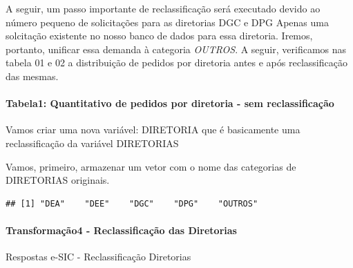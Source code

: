 \documentclass[]{article}
\newenvironment{Shaded}{\begin{snugshade}}{\end{snugshade}}
\newcommand{\CommentTok}[1]{\textcolor[rgb]{0.56,0.35,0.01}{\textit{#1}}}
\newcommand{\DataTypeTok}[1]{\textcolor[rgb]{0.13,0.29,0.53}{#1}}
\newcommand{\KeywordTok}[1]{\textcolor[rgb]{0.13,0.29,0.53}{\textbf{#1}}}
\newcommand{\NormalTok}[1]{#1}
\newcommand{\OperatorTok}[1]{\textcolor[rgb]{0.81,0.36,0.00}{\textbf{#1}}}
\newcommand{\StringTok}[1]{\textcolor[rgb]{0.31,0.60,0.02}{#1}}
\let\oldparagraph\paragraph
\renewcommand{\paragraph}[1]{\oldparagraph{#1}\mbox{}}
\begin{document}
A seguir, um passo importante de reclassificação será executado devido
ao número pequeno de solicitações para as diretorias DGC e DPG Apenas
uma solcitação existente no nosso banco de dados para essa diretoria.
Iremos, portanto, unificar essa demanda à categoria \emph{OUTROS}. A
seguir, verificamos nas tabela 01 e 02 a distribuição de pedidos por
diretoria antes e após reclassificação das mesmas.

\hypertarget{tabela1-quantitativo-de-pedidos-por-diretoria---sem-reclassificacao-1}{%
\paragraph{Tabela1: Quantitativo de pedidos por diretoria - sem
reclassificação}\label{tabela1-quantitativo-de-pedidos-por-diretoria---sem-reclassificacao-1}}

Vamos criar uma nova variável: DIRETORIA que é basicamente uma
reclassificação da variável DIRETORIAS

Vamos, primeiro, armazenar um vetor com o nome das categorias de
DIRETORIAS originais.

\begin{Shaded}
\end{Shaded}

\begin{verbatim}
## [1] "DEA"    "DEE"    "DGC"    "DPG"    "OUTROS"
\end{verbatim}

\hypertarget{transformacao4---reclassificacao-das-diretorias}{%
\paragraph{Transformação4 - Reclassificação das
Diretorias}\label{transformacao4---reclassificacao-das-diretorias}}

Respostas e-SIC - Reclassificação Diretorias

\begin{Shaded}
\end{Shaded}
\end{document}
